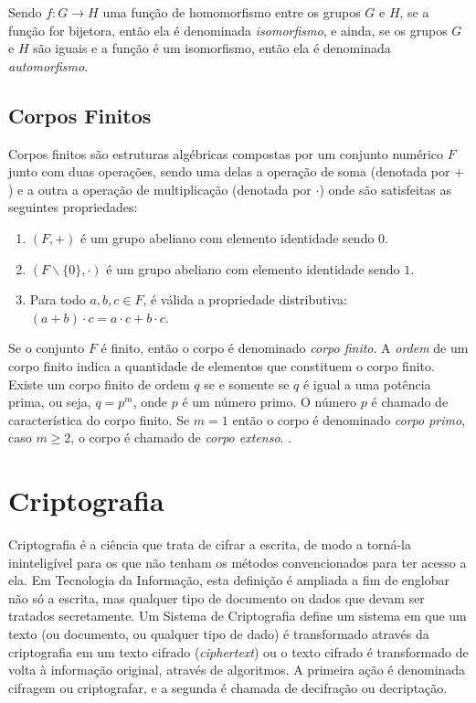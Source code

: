 Sendo $f: G \rightarrow H$ uma função de homomorfismo entre os grupos $G$ e $H$, se a função for bijetora, então ela é denominada \textit{isomorfismo}, e ainda, se os grupos $G$ e $H$ são iguais e a função é um isomorfismo, então ela é denominada \textit{automorfismo}\cite{Shokranian:2010}.

%
%
\subsection{Corpos Finitos}

Corpos finitos são estruturas algébricas compostas por um conjunto numérico $F$ junto com duas operações, sendo uma delas a operação de soma (denotada por $+$) e a outra a operação de multiplicação (denotada por $\cdot$) onde são satisfeitas as seguintes propriedades:\cite{Guide}

\begin{enumerate}
\item $(F, +)$ é um grupo abeliano com elemento identidade sendo $0$.
\item $(F\backslash\{0\}, \cdot)$ é um grupo abeliano com elemento identidade sendo $1$.
\item Para todo $a, b, c \in F$, é válida a propriedade distributiva: $(a + b) \cdot c = a \cdot c + b \cdot c$.
\end{enumerate}

Se o conjunto \(F\) é finito, então o corpo é denominado \textit{corpo finito}. A \textit{ordem} de um corpo finito indica a quantidade de elementos que constituem o corpo finito. Existe um corpo finito de ordem \(q\) se e somente se \(q\) é igual a uma potência prima, ou seja, $q = p^{m}$, onde \(p\) é um número primo. O número \(p\) é chamado de característica do corpo finito. Se $m = 1$ então o corpo é denominado \textit{corpo primo}, caso $m \geq 2$, o corpo é chamado de \textit{corpo extenso}. \cite{Guide}.

%
%
\section{Criptografia} \label{sec:criptografia}
Criptografia é a ciência que trata de cifrar a escrita, de modo a torná-la ininteligível para os que não tenham os métodos convencionados para ter acesso a ela. Em Tecnologia da Informação, esta definição é ampliada a fim de englobar não só a escrita, mas qualquer tipo de documento ou dados que devam ser tratados secretamente. Um Sistema de Criptografia define um sistema em que um texto (ou documento, ou qualquer tipo de dado) é transformado através da criptografia em um texto cifrado (\textit{ciphertext}) ou o texto cifrado é transformado de volta à informação original, através de algoritmos. A primeira ação é denominada cifragem ou criptografar, e a segunda é chamada de decifração ou decriptação. \cite{Portnoi:2005}

